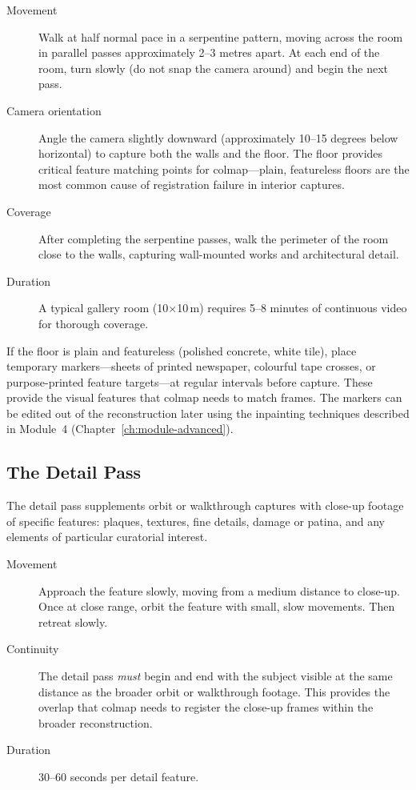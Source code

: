 \begin{description}
  \item[Movement] Walk at half normal pace in a serpentine pattern, moving across the room in parallel passes approximately 2--3 metres apart. At each end of the room, turn slowly (do not snap the camera around) and begin the next pass.
  \item[Camera orientation] Angle the camera slightly downward (approximately 10--15 degrees below horizontal) to capture both the walls and the floor. The floor provides critical feature matching points for \acrshort{colmap}---plain, featureless floors are the most common cause of registration failure in interior captures.
  \item[Coverage] After completing the serpentine passes, walk the perimeter of the room close to the walls, capturing wall-mounted works and architectural detail.
  \item[Duration] A typical gallery room (10$\times$10\,m) requires 5--8 minutes of continuous video for thorough coverage.
\end{description}

\begin{recommendation}
If the floor is plain and featureless (polished concrete, white tile), place temporary markers---sheets of printed newspaper, colourful tape crosses, or purpose-printed feature targets---at regular intervals before capture. These provide the visual features that \acrshort{colmap} needs to match frames. The markers can be edited out of the reconstruction later using the inpainting techniques described in Module~4 (Chapter~\ref{ch:module-advanced}).
\end{recommendation}

\subsection{The Detail Pass}
\label{sec:cap-detail}

The detail pass supplements orbit or walkthrough captures with close-up footage of specific features: plaques, textures, fine details, damage or patina, and any elements of particular curatorial interest.

\begin{description}
  \item[Movement] Approach the feature slowly, moving from a medium distance to close-up. Once at close range, orbit the feature with small, slow movements. Then retreat slowly.
  \item[Continuity] The detail pass \emph{must} begin and end with the subject visible at the same distance as the broader orbit or walkthrough footage. This provides the overlap that \acrshort{colmap} needs to register the close-up frames within the broader reconstruction.
  \item[Duration] 30--60 seconds per detail feature.
\end{description}

